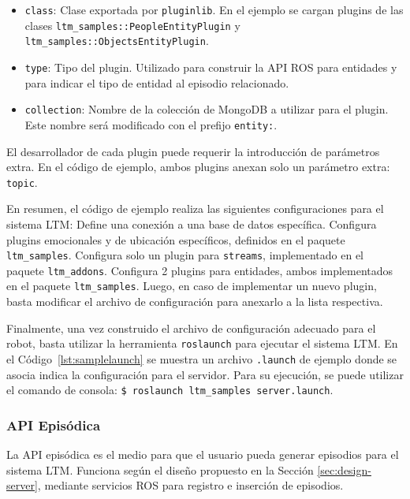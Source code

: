 \begin{itemize}
\begin{itemize}
	\item \texttt{class}: Clase exportada por \texttt{pluginlib}. En el ejemplo se cargan plugins de las clases \texttt{ltm\_samples::PeopleEntityPlugin} y \texttt{ltm\_samples::ObjectsEntityPlugin}.
	\item \texttt{type}: Tipo del plugin. Utilizado para construir la API ROS para entidades y para indicar el tipo de entidad al episodio relacionado.
	\item \texttt{collection}: Nombre de la colección de MongoDB a utilizar para el plugin. Este nombre será modificado con el prefijo \texttt{entity:}.
\end{itemize}
El desarrollador de cada plugin puede requerir la introducción de parámetros extra. En el código de ejemplo, ambos plugins anexan solo un parámetro extra: \texttt{topic}.
\end{itemize}

En resumen, el código de ejemplo realiza las siguientes configuraciones para el sistema LTM: Define una conexión a una base de datos específica. Configura plugins emocionales y de ubicación específicos, definidos en el paquete \texttt{ltm\_samples}. Configura solo un plugin para \texttt{streams}, implementado en el paquete \texttt{ltm\_addons}. Configura 2 plugins para entidades, ambos implementados en el paquete \texttt{ltm\_samples}. Luego, en caso de implementar un nuevo plugin, basta modificar el archivo de configuración para anexarlo a la lista respectiva.

Finalmente, una vez construido el archivo de configuración adecuado para el robot, basta utilizar la herramienta \texttt{roslaunch} para ejecutar el sistema LTM. En el Código~\ref{lst:samplelaunch} se muestra un archivo \texttt{.launch} de ejemplo donde se asocia indica la configuración para el servidor. Para su ejecución, se puede utilizar el comando de consola: \texttt{\$ roslaunch ltm\_samples server.launch}.
\lstset{style=/Style/XML/ROS}



\subsubsection{API Episódica}

La API episódica es el medio para que el usuario pueda generar episodios para el sistema LTM. Funciona según el diseño propuesto en la Sección \ref{sec:design-server}, mediante servicios ROS para registro e inserción de episodios.


